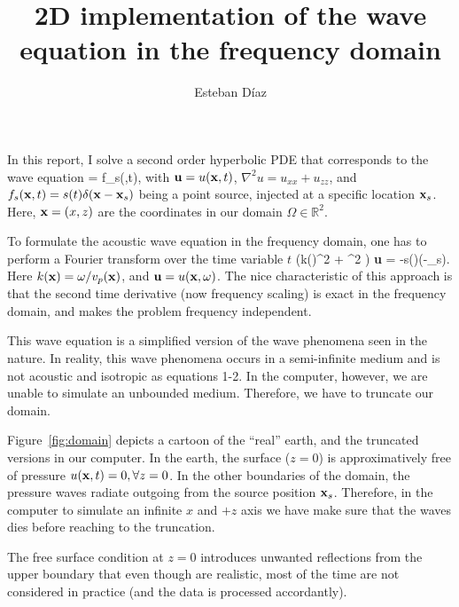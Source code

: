 \documentclass[10pt]{article}
\author{Esteban D\'{i}az}
\title{2D implementation of the wave equation in the frequency domain}{}
\begin{document}

\maketitle

In this report, I solve a second order hyperbolic PDE that corresponds to the wave equation
\beq
   = f_s(\xx,t),
  \label{eq:tawe}
\eeq 
with ${\bf u} = u({\bf x},t)$, $\nabla^2 u= u_{xx} + u_{zz}$, and  $f_s({\bf x},t) = s(t)\delta({\bf x}-{\bf x}_s)$ being a point source, injected at a specific location ${\bf x}_s$. Here,
 ${\bf x} = (x,z)$ are the coordinates in our domain $\Omega \in \mathbb{R}^2$.

To formulate the acoustic wave equation in the frequency domain, one has to perform a Fourier transform over 
the time variable $t$
\beq
\left(k(\xx)^2 + \nabla^2 \right)  {\bf u}  = -s(\omega)\delta(\xx-\xx_s).
  \label{eq:wawe}
\eeq
Here $k({\bf x}) = \omega/v_p({\bf x})$, and ${\bf u} = u({\bf x},\omega)$. The nice characteristic of this approach is that the
second time derivative (now frequency scaling) is exact in the frequency domain, and makes the problem frequency independent.


This wave equation is a simplified version of the wave phenomena seen in the nature. In reality, this wave phenomena occurs
in a semi-infinite medium and is not acoustic and isotropic as equations 1-2. In the computer, however,
we are unable to simulate an unbounded medium. Therefore, we have to truncate our domain.

Figure~\ref{fig:domain} depicts a cartoon of the ``real'' earth, and the truncated versions in our computer. 
In the earth, the surface ($z=0$) is approximatively free of pressure $u({\bf x},t) = 0, \forall z =0$. In the 
other boundaries of the domain, the pressure waves radiate outgoing from the source position ${\bf x}_s$. Therefore,
in the computer to simulate an infinite $x$ and $+z$ axis we have make sure that the waves dies before reaching
to the truncation.

The free surface condition at $z=0$ introduces unwanted reflections from the upper boundary that even though are
realistic, most of the time are not considered in practice (and the data is processed accordantly).
\end{document}
